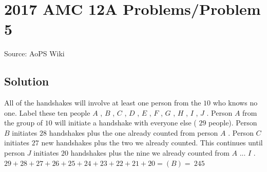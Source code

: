 \documentclass[12pt]{article}
\begin{document}
\section*{{2017 AMC 12A Problems/Problem 5}}
Source: AoPS Wiki

\subsection*{Solution}
All of the handshakes will involve at least one person from the $10$ who knows no one. Label these ten people $A$ , $B$ , $C$ , $D$ , $E$ , $F$ , $G$ , $H$ , $I$ , $J$ . Person $A$ from the group of $10$ will initiate a handshake with everyone else ( $29$ people). Person $B$ initiates $28$ handshakes plus the one already counted from person $A$ . Person $C$ initiates $27$ new handshakes plus the two we already counted. This continues until person $J$ initiates $20$ handshakes plus the nine we already counted from $A$ ... $I$ . $29+28+27+26+25+24+23+22+21+20 = \boxed{(B)=\ 245}$
\end{document}
